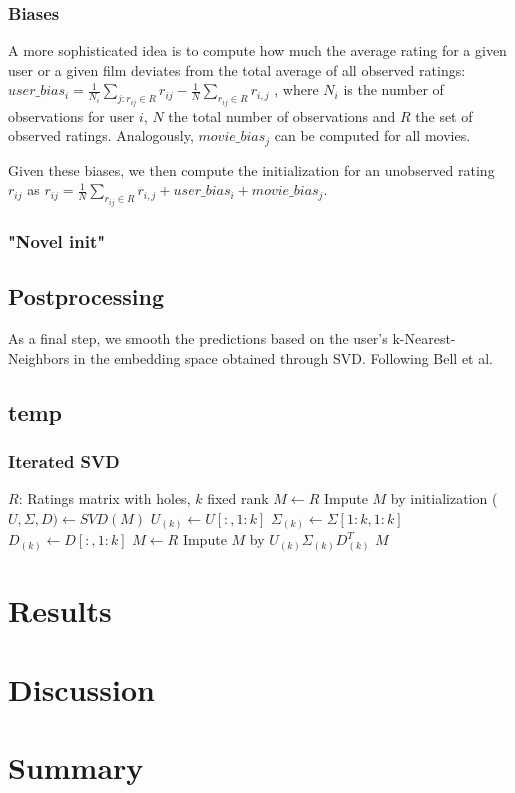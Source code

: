 \documentclass[10pt,conference,compsocconf]{IEEEtran}
\begin{document}
\subsubsection{Biases}
A more sophisticated idea is to compute how much the average rating for a given user or a given film deviates from the total average of all observed ratings: $user\_bias_i = \frac{1}{N_i} \sum_{j : r_{ij} \in R} r_{ij} - \frac{1}{N} \sum_{r_{ij} \in R} r_{i,j}$ , where $N_i$ is the number of observations for user $i$, $N$ the total number of observations and $R$ the set of observed ratings. Analogously, $movie\_bias_j$ can be computed for all movies. 

Given these biases, we then compute the initialization for an unobserved rating $r_{ij}$ as $r_{ij} = \frac{1}{N} \sum_{r_{ij} \in R} r_{i,j} + user\_bias_i + movie\_bias_j$.

\subsubsection{"Novel init"}



\subsection{Postprocessing}
As a final step, we smooth the predictions based on the user's  k-Nearest-Neighbors in the embedding space obtained through SVD. Following Bell et al. \cite{bell2007improved}

\subsection{temp}
\subsubsection{Iterated SVD}
\begin{algorithmic}
	\STATE $R$: Ratings matrix with holes, $k$ fixed rank
	\STATE $M \leftarrow R$
	\STATE Impute $M$ by initialization
    	\STATE ($U, \Sigma, D) \leftarrow SVD(M)$
    	\STATE $U_{(k)} \leftarrow U[:, 1:k]$
    	\STATE $\Sigma_{(k)} \leftarrow \Sigma[1:k, 1:k]$
    	\STATE $D_{(k)} \leftarrow D[:, 1:k]$
    	\STATE $M \leftarrow R$
    	\STATE Impute $M$ by $U_{(k)} \Sigma_{(k)} D_{(k)}^T$
    \ENDFOR
    \RETURN $M$
\end{algorithmic}


\section{Results}
\label{sec:results}


\section{Discussion}
\label{sec:discussion}

\section{Summary}




\end{document}
